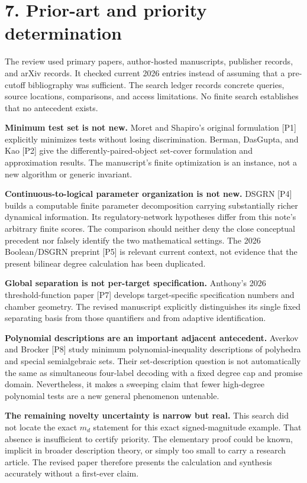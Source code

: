 \documentclass[
  11pt,
]{article}
\begin{document}
\section{7. Prior-art and priority
determination}\label{prior-art-and-priority-determination}

The review used primary papers, author-hosted manuscripts, publisher
records, and arXiv records. It checked current 2026 entries instead of
assuming that a pre-cutoff bibliography was sufficient. The search
ledger records concrete queries, source locations, comparisons, and
access limitations. No finite search establishes that no antecedent
exists.

\textbf{Minimum test set is not new.} Moret and Shapiro's original
formulation {[}P1{]} explicitly minimizes tests without losing
discrimination. Berman, DasGupta, and Kao {[}P2{]} give the
differently-paired-object set-cover formulation and approximation
results. The manuscript's finite optimization is an instance, not a new
algorithm or generic invariant.

\textbf{Continuous-to-logical parameter organization is not new.} DSGRN
{[}P4{]} builds a computable finite parameter decomposition carrying
substantially richer dynamical information. Its regulatory-network
hypotheses differ from this note's arbitrary finite scores. The
comparison should neither deny the close conceptual precedent nor
falsely identify the two mathematical settings. The 2026 Boolean/DSGRN
preprint {[}P5{]} is relevant current context, not evidence that the
present bilinear degree calculation has been duplicated.

\textbf{Global separation is not per-target specification.} Anthony's
2026 threshold-function paper {[}P7{]} develops target-specific
specification numbers and chamber geometry. The revised manuscript
explicitly distinguishes its single fixed separating basis from those
quantifiers and from adaptive identification.

\textbf{Polynomial descriptions are an important adjacent antecedent.}
Averkov and Brocker {[}P8{]} study minimum polynomial-inequality
descriptions of polyhedra and special semialgebraic sets. Their
set-description question is not automatically the same as simultaneous
four-label decoding with a fixed degree cap and promise domain.
Nevertheless, it makes a sweeping claim that fewer high-degree
polynomial tests are a new general phenomenon untenable.

\textbf{The remaining novelty uncertainty is narrow but real.} This
search did not locate the exact \(m_d\) statement for this exact
signed-magnitude example. That absence is insufficient to certify
priority. The elementary proof could be known, implicit in broader
description theory, or simply too small to carry a research article. The
revised paper therefore presents the calculation and synthesis
accurately without a first-ever claim.
\end{document}
